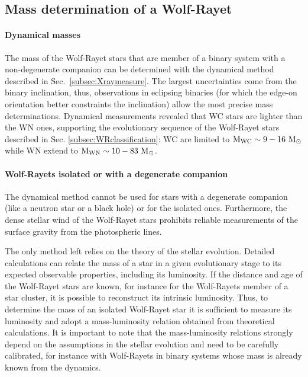 \documentclass[a4paper,titlepage]{book}     	%
\newcommand{\sun}{\ensuremath{_\odot}}
\newcommand{\msun}{\ensuremath{M\sun}}
\begin{document}
\subsection{Mass determination of a Wolf-Rayet}\label{subsec:massWR}
\paragraph{Dynamical masses} The mass of the Wolf-Rayet stars that are member of a binary system with a non-degenerate companion can be determined with the dynamical method described in Sec.\ \ref{subsec:Xraymeasure}. The largest uncertainties come from the binary inclination, thus, observations in eclipsing binaries (for which the edge-on orientation better constraints the inclination) allow the most precise mass determinations. Dynamical measurements revealed that WC stars are lighter than the WN ones, supporting the evolutionary sequence of the Wolf-Rayet stars described in Sec. \ref{subsec:WRclassification}: WC are limited to $\rm M_{\rm WC}\sim 9-16~\msun$ while WN extend to $\rm M_{\rm WN}\sim 10-83~\msun$. \cite{WR_signature}

\paragraph{Wolf-Rayets isolated or with a degenerate companion} The dynamical method cannot be used for stars with a degenerate companion (like a neutron star or a black hole) or for the isolated ones. Furthermore, the dense stellar wind of the Wolf-Rayet stars prohibits reliable measurements of the surface gravity from the photospheric lines. 

The only method left relies on the theory of the stellar evolution.  Detailed calculations can relate the mass of a star in a given evolutionary stage to its expected observable properties, including its luminosity. If the distance and age of the Wolf-Rayet stars are known, for instance for the Wolf-Rayets member of a star cluster, it is possible to reconstruct its intrinsic luminosity. Thus, to determine the mass of an isolated Wolf-Rayet star it is sufficient to measure its luminosity and adopt a mass-luminosity relation obtained from theoretical calculations. It is important to note that the mass-luminosity relations strongly depend on the assumptions in the stellar evolution and need to be carefully calibrated, for instance with Wolf-Rayets in binary systems whose mass is already known from the dynamics. \cite{Nugis2000_WRwinds}
\end{document}
